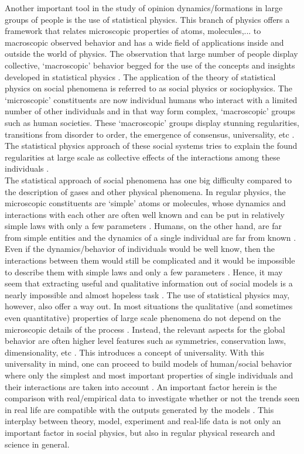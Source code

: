 \documentclass[11 pt , letterpaper , twoside , openright]{book}
\begin{document}
Another important tool in the study of opinion dynamics/formations in large groups of people is the use of statistical physics. This branch of physics offers a framework that relates microscopic properties of atoms, molecules,... to macroscopic observed behavior and has a wide field of applications inside and outside the world of physics. The observation that large number of people display collective, `macroscopic' behavior begged for the use of the concepts and insights developed in statistical physics \cite{Sirbu2016}. The application of the theory of statistical physics on social phenomena is referred to as social physics or sociophysics. The `microscopic' constituents are now individual humans who interact with a limited number of other individuals and in that way form complex, `macroscopic' groups such as human societies. These `macroscopic' groups display stunning regularities, transitions from disorder to order, the emergence of consensus, universality, etc \cite{Buchanan2007}. The statistical physics approach of these social systems tries to explain the found regularities at large scale as collective effects of the interactions among these individuals \cite{Sirbu2016}.\\
\newline
The statistical approach of social phenomena has one big difficulty compared to the description of gases and other physical phenomena. In regular physics, the microscopic constituents are `simple' atoms or molecules, whose dynamics and interactions with each other are often well known and can be put in relatively simple laws with only a few parameters \cite{Castellano2009}. Humans, on the other hand, are far from simple entities and the dynamics of a single individual are far from known \cite{Castellano2009}. Even if the dynamics/behavior of individuals would be well know, then the interactions between them would still be complicated and it would be impossible to describe them with simple laws and only a few parameters \cite{Castellano2009}. Hence, it may seem that extracting useful and qualitative information out of social models is a nearly impossible and almost hopeless task \cite{Castellano2009}. The use of statistical physics may, however, also offer a way out. In most situations the qualitative (and sometimes even quantitative) properties of large scale phenomena do not depend on the microscopic details of the process \cite{Castellano2009}. Instead, the relevant aspects for the global behavior are often higher level features such as symmetries, conservation laws, dimensionality, etc \cite{Castellano2009}. This introduces a concept of universality. With this universality in mind, one can proceed to build models of human/social behavior where only the simplest and most important properties of single individuals and their interactions are taken into account \cite{Castellano2009}. An important factor herein is the comparison with real/empirical data to investigate whether or not the trends seen in real life are compatible with the outputs generated by the models \cite{Castellano2009}\cite{Pawel}. This interplay between theory, model, experiment and real-life data is not only an important factor in social physics, but also in regular physical research and science in general.
\end{document}
